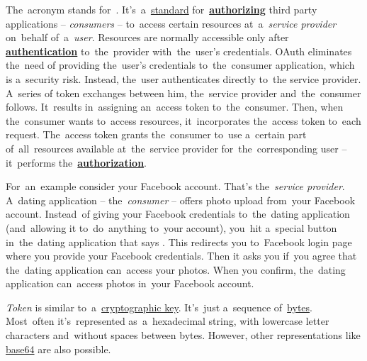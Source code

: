 The~acronym stands for~.
It's~a~\hyperref[protocolstandard]{standard} for~\hyperref[authenticationauthorization]{\textbf{authorizing}} third party applications -- \textit{consumers} -- to~access certain resources at~a~\textit{service provider} on~behalf of~a~\textit{user}.
Resources are normally accessible only after \hyperref[authenticationauthorization]{\textbf{authentication}} to~the~provider with~the~user's credentials.
OAuth eliminates the~need of providing the~user's credentials to~the~consumer application, which is a~security risk.
Instead, the~user authenticates directly to~the service provider.
A~series of token exchanges between him, the~service provider and~the~consumer follows.
It~results in~assigning an~access token to~the~consumer.
Then, when the~consumer wants to~access resources, it~incorporates the~access token to~each request.
The~access token grants the~consumer to~use a~certain part of~all~resources available at~the~service provider for~the~corresponding user -- it~performs the~\hyperref[authenticationauthorization]{\textbf{authorization}}.

For~an~example consider your Facebook account.
That's the~\textit{service provider}.
A~dating application -- the~\textit{consumer} -- offers photo upload from~your Facebook account.
Instead~of giving your Facebook credentials to~the~dating application (and~allowing it to~do~anything to~your account), you~hit a~special button in~the~dating application that says .
This redirects you to~Facebook login page where you provide your Facebook credentials.
Then it asks you if~you agree that the~dating application can~access your photos.
When you confirm, the~dating application can~access photos in~your Facebook account.

\textit{Token} is similar to~a~\hyperref[key]{cryptographic key}.
It's~just a~sequence of~\hyperref[bitsbytes]{bytes}.
Most~often it's~represented as~a~hexadecimal string, with lowercase letter characters and~without spaces between bytes.
However, other representations like \hyperref[base64]{base64} are also possible.

